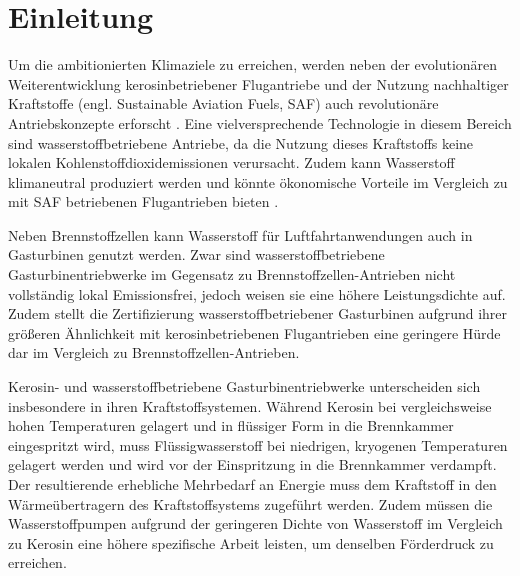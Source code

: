 \chapter{Einleitung}\label{chap:einleitung}



Um die ambitionierten Klimaziele zu erreichen, werden neben der evolutionären Weiterentwicklung kerosinbetriebener Flugantriebe und der Nutzung nachhaltiger Kraftstoffe (engl. Sustainable Aviation Fuels, SAF) auch revolutionäre Antriebskonzepte erforscht \cite{cleanskies, EuropeanCommission2011}. Eine vielversprechende Technologie in diesem Bereich sind wasserstoffbetriebene Antriebe, da die Nutzung dieses Kraftstoffs keine lokalen Kohlenstoffdioxidemissionen verursacht. Zudem kann Wasserstoff klimaneutral produziert werden und könnte  ökonomische Vorteile im Vergleich zu mit SAF betriebenen Flugantrieben bieten \cite{VanLandingham}.

Neben Brennstoffzellen kann Wasserstoff für Luftfahrtanwendungen auch in Gasturbinen genutzt werden. Zwar sind wasserstoffbetriebene Gasturbinentriebwerke im Gegensatz zu Brennstoffzellen-Antrieben nicht vollständig lokal Emissionsfrei, jedoch weisen sie eine höhere Leistungsdichte auf. Zudem stellt die Zertifizierung wasserstoffbetriebener Gasturbinen aufgrund ihrer größeren Ähnlichkeit mit kerosinbetriebenen Flugantrieben eine geringere Hürde dar im Vergleich zu Brennstoffzellen-Antrieben. \cite{Kadyk.2018}

Kerosin- und wasserstoffbetriebene Gasturbinentriebwerke unterscheiden sich insbesondere in ihren Kraftstoffsystemen. Während Kerosin bei vergleichsweise hohen Temperaturen gelagert und in flüssiger Form in die Brennkammer eingespritzt wird, muss Flüssigwasserstoff bei niedrigen, kryogenen Temperaturen gelagert werden und wird vor der Einspritzung in die Brennkammer verdampft. Der resultierende erhebliche Mehrbedarf an Energie muss dem Kraftstoff in den Wärmeübertragern des Kraftstoffsystems zugeführt werden. Zudem müssen die Wasserstoffpumpen aufgrund der geringeren Dichte von Wasserstoff im Vergleich zu Kerosin eine höhere spezifische Arbeit leisten, um denselben Förderdruck zu erreichen. 

